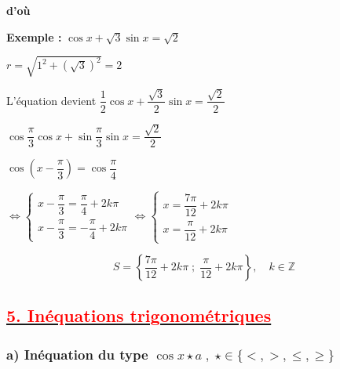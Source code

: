 \documentclass[12pt,a4paper]{article}
\begin{document}
\vspace{1cm}

 \textbf{ d'où } 

\vspace{1cm}

\noindent \textbf{Exemple :} $\cos x + \sqrt{3}\sin x = \sqrt{2}$

\vspace{0.3cm}

\noindent $r = \sqrt{1^2 + (\sqrt{3})^2} = 2$

\vspace{0.2cm}

\noindent L'équation devient $\dfrac{1}{2}\cos x + \dfrac{\sqrt{3}}{2}\sin x = \dfrac{\sqrt{2}}{2}$

\vspace{0.2cm}

\noindent \phantom{L'équation devient } $\cos \dfrac{\pi}{3}\cos x + \sin \dfrac{\pi}{3}\sin x = \dfrac{\sqrt{2}}{2}$

\vspace{0.2cm}

\noindent \phantom{L'équation devient } $\cos\left(x - \dfrac{\pi}{3}\right) = \cos \dfrac{\pi}{4}$

\vspace{0.3cm}

\noindent \phantom{L'équation devient } $\iff \begin{cases} x - \dfrac{\pi}{3} = \dfrac{\pi}{4} + 2k\pi \\[4mm] x - \dfrac{\pi}{3} = -\dfrac{\pi}{4} + 2k\pi \end{cases} \iff \begin{cases} x = \dfrac{7\pi}{12} + 2k\pi \\[4mm] x = \dfrac{\pi}{12} + 2k\pi \end{cases}$

\vspace{0.5cm}

\[
S = \left\{ \frac{7\pi}{12} + 2k\pi \;;\; \frac{\pi}{12} + 2k\pi \right\}, \quad k \in \mathbb{Z}
\]

\subsection*{\underline{\textbf{\textcolor{red}{5. Inéquations trigonométriques }}}}
\subsubsection*{a) Inéquation du type $\cos x \star a \;,\; \star \in \{<, >, \le, \ge\}$}
\end{document}
